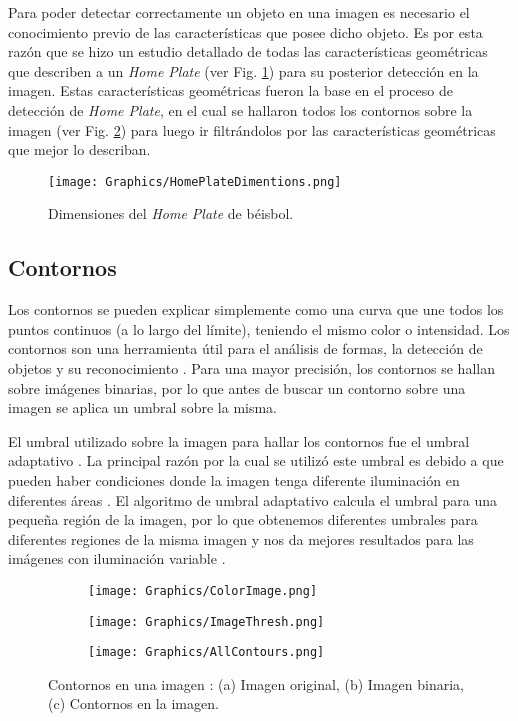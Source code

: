 Para poder detectar correctamente un objeto en una imagen es necesario el conocimiento previo de las características que posee dicho objeto. Es por esta razón que se hizo un estudio detallado de todas las características geométricas que describen a un \textit{Home Plate} (ver Fig. \ref{fig:HomePlateDimentions}) para su posterior detección en la imagen. Estas características geométricas fueron la base en el proceso de detección de \textit{Home Plate}, en el cual se hallaron todos los contornos sobre la imagen (ver Fig. \ref{fig:ImagesContours}) para luego ir filtrándolos por las características geométricas que mejor lo describan.

\begin{figure}[!h]
    \centering
    \texttt{[image: Graphics/HomePlateDimentions.png]}
    \caption{Dimensiones del \textit{Home Plate} de béisbol.}
    \label{fig:HomePlateDimentions}
\end{figure}

\subsection{Contornos}

Los contornos se pueden explicar simplemente como una curva que une todos los puntos continuos (a lo largo del límite), teniendo el mismo color o intensidad. Los contornos son una herramienta útil para el análisis de formas, la detección de objetos y su reconocimiento \cite{Contours}. Para una mayor precisión, los contornos se hallan sobre imágenes binarias, por lo que antes de buscar un contorno sobre una imagen se aplica un umbral sobre la misma.

El umbral utilizado sobre la imagen para hallar los contornos fue el umbral adaptativo \cite{AdaptiveThreshold}. La principal razón por la cual se utilizó este umbral es debido a que pueden haber condiciones donde la imagen tenga diferente iluminación en diferentes áreas \cite{AdaptiveThresholdOpenCV}. El algoritmo de umbral adaptativo calcula el umbral para una pequeña región de la imagen, por lo que obtenemos diferentes umbrales para diferentes regiones de la misma imagen y nos da mejores resultados para las imágenes con iluminación variable \cite{AdaptiveThresholdOpenCV}.

\begin{figure}[h!]
	\centering
	\begin{subfigure}[b]{0.32\linewidth}
		\centering
		\texttt{[image: Graphics/ColorImage.png]}
		\caption{}
	\end{subfigure}
	\begin{subfigure}[b]{0.32\linewidth}
		\centering
		\texttt{[image: Graphics/ImageThresh.png]}
		\caption{}
	\end{subfigure}    
	\begin{subfigure}[b]{0.32\linewidth}
		\centering
		\texttt{[image: Graphics/AllContours.png]}
		\caption{}
	\end{subfigure}    
	\caption{Contornos en una imagen : (a) Imagen original, (b) Imagen binaria, (c) Contornos en la imagen.}
	\label{fig:ImagesContours}
\end{figure}    

